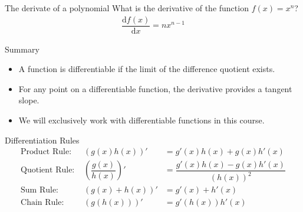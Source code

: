 \documentclass{beamer}
\begin{document}
    \begin{frame}{The derivate of a polynomial}
      What is the derivative of the function $f(x) = x^n$?
      \begin{align}
        \dfrac{\text{d}f(x)}{\text{d} x} = n x^{n-1}  
      \end{align}
    \end{frame}

    \begin{frame}{Summary}
      \begin{itemize}
        \item A function is differentiable if the limit of the difference quotient exists.
        \item For any point on a differentiable function, the derivative provides a tangent slope.
        \item We will exclusively work with differentiable functions in this course.
      \end{itemize}
    \end{frame}

    \begin{frame}{Differentiation Rules \cite{deisenroth2020mathematics}}
      \begin{align}
        \text{Product Rule:  }  &(g(x)h(x))'  &= g'(x)h(x) + g(x)h'(x) \\
        \text{Quotient Rule:  } &(\dfrac{g(x)}{h(x)})' &= \dfrac{g'(x)h(x) - g(x)h'(x)}{(h(x))^2}  \\
        \text{Sum Rule:  }      &(g(x) + h(x))' &= g'(x) + h'(x) \\
        \text{Chain Rule:  }    &(g(h(x)))'     &= g'(h(x))h'(x)
      \end{align}
    \end{frame}
\end{document}
